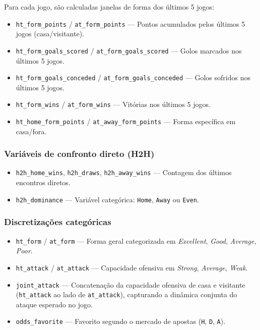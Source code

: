 \documentclass[12pt, a4paper]{article}
\begin{document}
Para cada jogo, são calculadas janelas de forma dos últimos 5 jogos:

\begin{itemize}
  \item \texttt{ht\_form\_points} / \texttt{at\_form\_points} — Pontos acumulados pelos últimos 5 jogos (casa/visitante).
  \item \texttt{ht\_form\_goals\_scored} / \texttt{at\_form\_goals\_scored} — Golos marcados nos últimos 5 jogos.
  \item \texttt{ht\_form\_goals\_conceded} / \texttt{at\_form\_goals\_conceded} — Golos sofridos nos últimos 5 jogos.
  \item \texttt{ht\_form\_wins} / \texttt{at\_form\_wins} — Vitórias nos últimos 5 jogos.
  \item \texttt{ht\_home\_form\_points} / \texttt{at\_away\_form\_points} — Forma específica em casa/fora.
\end{itemize}

\subsubsection{Variáveis de confronto direto (H2H)}

\begin{itemize}
  \item \texttt{h2h\_home\_wins}, \texttt{h2h\_draws}, \texttt{h2h\_away\_wins} — Contagem dos últimos encontros diretos.
  \item \texttt{h2h\_dominance} — Variável categórica: \texttt{Home}, \texttt{Away} ou \texttt{Even}.
\end{itemize}

\subsubsection{Discretizações categóricas}

\begin{itemize}
  \item \texttt{ht\_form} / \texttt{at\_form} — Forma geral categorizada em \textit{Excellent}, \textit{Good}, \textit{Average}, \textit{Poor}.
  \item \texttt{ht\_attack} / \texttt{at\_attack} — Capacidade ofensiva em \textit{Strong}, \textit{Average}, \textit{Weak}.
  \item \texttt{joint\_attack} — Concatenação da capacidade ofensiva de casa e visitante (\texttt{ht\_attack} ao lado de \texttt{at\_attack}), capturando a dinâmica conjunta do ataque esperado no jogo.
  \item \texttt{odds\_favorite} — Favorito segundo o mercado de apostas (\texttt{H}, \texttt{D}, \texttt{A}).
\end{itemize}
\end{document}

